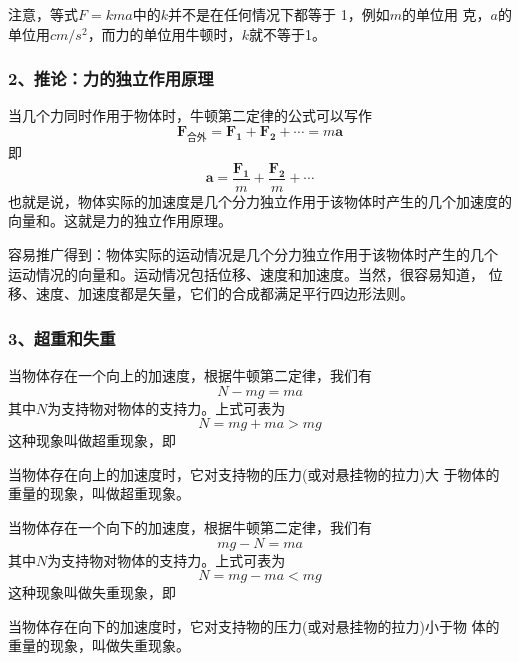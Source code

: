 注意，等式$ F = kma $中的$ k $并不是在任何情况下都等于 1，例如$ m $的单位用
克，$a$的单位用$cm/s^2$，而力的单位用牛顿时，$k$就不等于1。

\subsubsection{2、推论：力的独立作用原理}
当几个力同时作用于物体时，牛顿第二定律的公式可以写作 
\begin{equation}
    \boldsymbol{F}_{\text{合外}}=\boldsymbol{F_1}+\boldsymbol{F_2}+\cdots=
    m\boldsymbol{a}
\end{equation}
即 
\begin{equation}
    \boldsymbol{a}=\frac{\boldsymbol{F_1}}{m}+\frac{\boldsymbol{F_2}}{m}
    +\cdots
\end{equation}
也就是说，物体实际的加速度是几个分力独立作用于该物体时产生的几个加速度的
向量和。这就是力的独立作用原理。

容易推广得到：物体实际的运动情况是几个分力独立作用于该物体时产生的几个
运动情况的向量和。运动情况包括位移、速度和加速度。当然，很容易知道，
位移、速度、加速度都是矢量，它们的合成都满足平行四边形法则。
\subsubsection{3、超重和失重}
当物体存在一个向上的加速度，根据牛顿第二定律，我们有 
\begin{equation}
    N-mg=ma
\end{equation}
其中$N$为支持物对物体的支持力。上式可表为
\begin{equation}
    N=mg+ma>mg
\end{equation}
这种现象叫做超重现象，即
\begin{definition}
    当物体存在向上的加速度时，它对支持物的压力(或对悬挂物的拉力)大
    于物体的重量的现象，叫做超重现象。
\end{definition}

当物体存在一个向下的加速度，根据牛顿第二定律，我们有 
\begin{equation}
    mg-N=ma
\end{equation}
其中$N$为支持物对物体的支持力。上式可表为
\begin{equation}
    N=mg-ma<mg
\end{equation}
这种现象叫做失重现象，即
\begin{definition}
    当物体存在向下的加速度时，它对支持物的压力(或对悬挂物的拉力)小于物
    体的重量的现象，叫做失重现象。
\end{definition}
